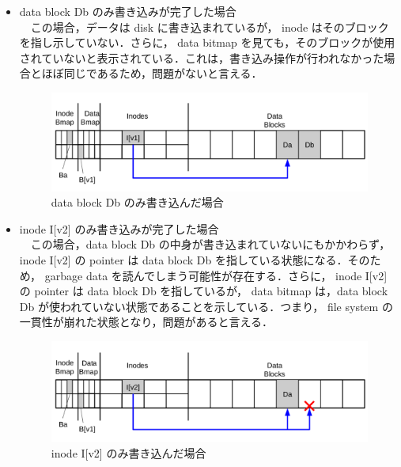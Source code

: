 \documentclass[graduation-thesis]{jsarticle}
\begin{document}
\begin{itemize}
	\item{data block Db のみ書き込みが完了した場合}\mbox{}\\
　この場合，データは disk に書き込まれているが， inode はそのブロックを指し示していない．さらに， data bitmap を見ても，そのブロックが使用されていないと表示されている．これは，書き込み操作が行われなかった場合とほぼ同じであるため，問題がないと言える．\\
\begin{figure}[H]
	\begin{center}
		\includegraphics[width=15.0cm,clip]{images/data3.pdf}
		\caption{data block Db のみ書き込んだ場合}
		\label{fig:data3}
	\end{center}
\end{figure}
	\item{inode I[v2] のみ書き込みが完了した場合}\\
　この場合，data block Db の中身が書き込まれていないにもかかわらず， inode I[v2] の pointer は data block Db を指している状態になる．そのため， garbage data を読んでしまう可能性が存在する．さらに， inode I[v2] の pointer は data block Db を指しているが， data bitmap は，data block Db が使われていない状態であることを示している．つまり， file system の一貫性が崩れた状態となり，問題があると言える．\\
\begin{figure}[H]
	\begin{center}
		\includegraphics[width=15.0cm,clip]{images/data4.pdf}
		\caption{inode I[v2] のみ書き込んだ場合}
		\label{fig:data4}
	\end{center}
\end{figure}

\end{itemize}
\end{document}
